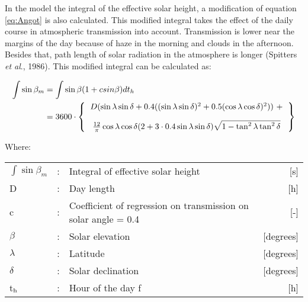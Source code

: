 In the model the integral of the effective solar height, a modification of equation \ref{eq:Angot} is
also calculated. This modified integral takes the effect of the daily course in atmospheric
transmis\-sion into account. Transmission is lower near the margins of the day because of
haze in the morning and clouds in the afternoon. Besides that, path length of solar
radiation in the atmosphere is longer (Spitters {\it et al}., 1986). This modified integral 
can be calculated as:

\begin{align}
\label{eq:IntSolarHeight}
\int \sin \beta_{m} &= \int \sin \beta (1+csin \beta ) dt_{h}  \\
                    &= 3600 \cdot \left \{
                    \begin{tabular}{c}
                        $D ( \sin \lambda \sin \delta + 0.4 
                            (( \sin \lambda \sin \delta )^{2} + 0.5( 
                            \cos \lambda \cos \delta ) ^{2} )) ~ + \nonumber$ \\[1em]
                        ${\frac{12}{\pi}} \cos \lambda \cos 
                            \delta (2+3 \cdot 0.4 \sin \lambda \sin \delta ) 
                            \sqrt{1-\tan^{2} \lambda \tan^{2} \delta } \nonumber$
                    \end{tabular}
                    \right \}
\end{align}

Where:\\[5pt]
\begin{tabularx}{\textwidth}{llXr}
$\int \sin \beta_{m}$  &:& Integral of effective solar height   & [s]\\
D  &:& Day length       & [h]\\
c  &:& Coefficient of regression on transmission on solar angle = 0.4  & [-]\\
$\beta$  &:& Solar elevation   & [degrees]\\
$\lambda$  &:& Latitude   & [degrees]\\
$\delta$  &:& Solar declination   & [degrees]\\
t$_{{\rm h}}$  &:& Hour of the day  f & [h]\\
\end{tabularx}

